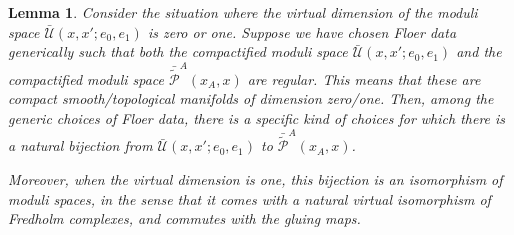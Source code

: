 \documentclass{amsart}
\newtheorem{lemma}[theorem]{Lemma}
\numberwithin{equation}{section}
\numberwithin{figure}{section}
\begin{document}
\begin{lemma}\label{isomorphism of moduli spaces of strips}
	Consider the situation where the virtual dimension of the moduli space $\bar{\mathcal{U}}(x, x'; e_{0}, e_{1})$ is zero or one. Suppose we have chosen Floer data generically such that both the compactified moduli space $\bar{\mathcal{U}}(x, x'; e_{0}, e_{1})$ and the compactified moduli space $\bar{\tilde{\mathcal{P}}}^{A}(x_{A}, x)$ are regular. This means that these are compact smooth/topological manifolds of dimension zero/one. Then, among the generic choices of Floer data, there is a specific kind of choices for which there is a natural bijection from $\bar{\mathcal{U}}(x, x'; e_{0}, e_{1})$ to $\bar{\tilde{\mathcal{P}}}^{A}(x_{A}, x)$. \par
	Moreover, when the virtual dimension is one, this bijection is an isomorphism of moduli spaces, in the sense that it comes with a natural virtual isomorphism of Fredholm complexes, and commutes with the gluing maps.
\end{lemma}
\end{document}
